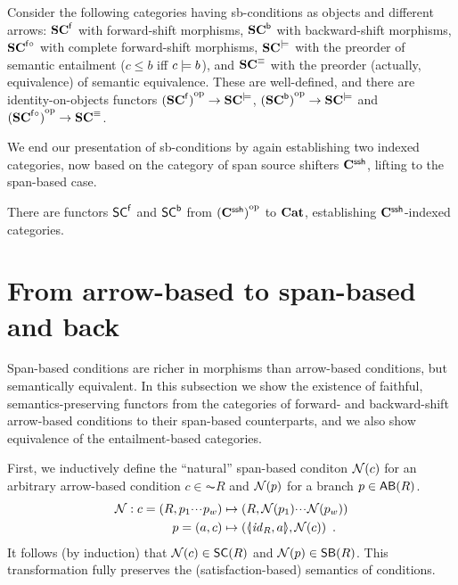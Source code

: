 \begin{theorem}
Consider the following categories having sb-conditions as objects and different arrows: 
$\mathbf{SC}^{\mathsf{f}}$ with forward-shift morphisms, $\mathbf{SC}^{{\mathsf{b}}}$ with backward-shift morphisms, $\mathbf{SC}^{{\mathsf{f}}{\circ}}$ with complete forward-shift morphisms, $\mathbf{SC}^{\models}$ with the preorder of semantic entailment ($c \leq b$ iff $c\models b$), and $\mathbf{SC}^\equiv$ with the preorder (actually, equivalence) of semantic equivalence. These are well-defined, and there are identity-on-objects functors ${(\mathbf{SC}^{\mathsf{f}})}^{\mathrm{op}} \rightarrow \mathbf{SC}^{\models}$, ${(\mathbf{SC}^{\mathsf{b}})}^{\mathrm{op}} \rightarrow \mathbf{SC}^{\models}$ and ${(\mathbf{SC}^{{\mathsf{f}}{\circ}})}^{\mathrm{op}} \rightarrow \mathbf{SC}^{\equiv}$.
\end{theorem}
%
We end our presentation of sb-conditions by again establishing two indexed categories, now based on the category of span source shifters $\mathbf{C}^{\mathsf{ssh}}$, lifting  to the span-based case.

\begin{proposition}
There are functors $\mathsf{SC}^{\mathsf{f}}$ and $\mathsf{SC}^{\mathsf{b}}$ from ${(\mathbf{C}^{\mathsf{ssh}})}^{\mathrm{op}}$ to $\mathbf{Cat}$, establishing $\mathbf{C}^{\mathsf{ssh}}$-indexed categories.
\end{proposition}

\section{From arrow-based to span-based and back}

Span-based conditions are richer in morphisms than arrow-based conditions, but semantically equivalent. In this subsection we show the existence of faithful, semantics-preserving functors from the categories of forward- and backward-shift arrow-based conditions to their span-based counterparts, and we also show equivalence of the entailment-based categories.

First, we inductively define the ``natural'' span-based conditon $\mathcal{N}(c)$ for an arbitrary arrow-based condition $c\in \AC R$ and $\mathcal{N}(p)$ for a branch $p\in \AB R$. 
\begin{align*}
\cN: c = (R,p_1\ccdots p_w) & \mapsto (R,\cN(p_1)\ccdots \cN(p_w)) \\
      p=(a,c) & \mapsto (\spanof{\id_R}{a},\cN(c)) \enspace.
\end{align*}
%
It follows (by induction) that $\cN(c)\in \SC R$ and $\cN(p)\in \SB R$. This transformation fully preserves the (satisfaction-based) semantics of conditions.

